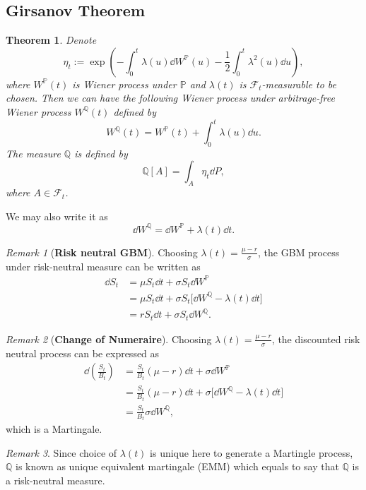 \documentclass[10pt]{article}
\theoremstyle{remark}
\newtheorem{Remark}{Remark}[section]
\theoremstyle{plain}
\newtheorem{Theorem}{Theorem}[section]
\numberwithin{equation}{section}
\begin{document}
\subsection{Girsanov Theorem}
\begin{Theorem}
	Denote
	\[
		\eta_t := \exp(-\int_0^t \lambda(u) \dd{W^\mathbb{P}(u)} - \frac{1}{2} \int_0^t \lambda^2(u) \dd{u}), 
	\]
	where $W^\mathbb{P}(t)$ is Wiener process under $\mathbb{P}$ and $\lambda(t) $ is $\mathcal{F}_t$-measurable to be chosen. Then we can have the following Wiener process under arbitrage-free Wiener process $W^\mathbb{Q}(t)$ defined by
	\[
		W^\mathbb{Q}(t) = W^\mathbb{P}(t) + \int_0^t \lambda(u) \dd{u}. 
	\]
	The measure $\mathbb{Q}$ is defined by 
	\[
	\mathbb{Q}[A] = \int_A \eta_t \dd{P},
	\]
	where $A \in \mathcal{F}_t$.
\end{Theorem}

We may also write it as 
	\begin{equation}
		\dd{W^\mathbb{Q}} = \dd{W^\mathbb{P}} + \lambda(t) \dd{t}.
	\end{equation}
\begin{Remark}[\textbf{Risk neutral GBM}]
	Choosing $\lambda(t) = \frac{\mu - r}{\sigma}$, the GBM process under risk-neutral measure can be written as
	\begin{align*}
		\dd{S_t} & = \mu S_t \dd{t} + \sigma S_t \dd{W^\mathbb{P}}
		\\
		& = \mu S_t \dd{t} + \sigma S_t \big[\dd{W^\mathbb{Q}} - \lambda(t) \dd{t} \big]
		\\
		& = r S_t \dd{t} + \sigma S_t \dd{W^\mathbb{Q}}.
	\end{align*}
\end{Remark}

\begin{Remark}[\textbf{Change of Numeraire}]
	Choosing $\lambda(t) = \frac{\mu - r}{\sigma}$, the discounted risk neutral process can be expressed as
	\begin{align*}
		\dd{\left(\frac{S_t}{B_t}\right)} & = \frac{S_t}{B_t} (\mu - r) \dd{t} + \sigma \dd{W^\mathbb{P}}
		\\
		& = \frac{S_t}{B_t} (\mu - r) \dd{t} + \sigma \big[\dd{W^\mathbb{Q}} - \lambda(t) \dd{t} \big]
		\\
		& = \frac{S_t}{B_t} \sigma \dd{W^\mathbb{Q}},
	\end{align*}
	which is a Martingale.
\end{Remark}


\begin{Remark}
	Since choice of $\lambda(t)$ is unique here to generate a Martingle process, $\mathbb{Q}$ is known as unique equivalent martingale (EMM) which equals to say that $\mathbb{Q}$ is a risk-neutral measure.
\end{Remark}
\end{document}
